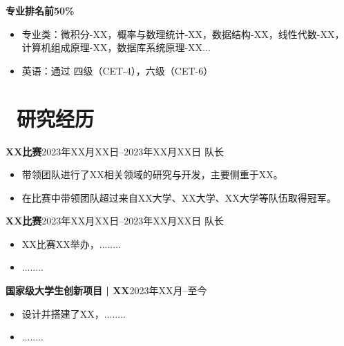 \documentclass[11pt]{article}
\begin{document}
 {\bf 专业排名前50\%}
\begin{itemize}[parsep=0.5ex]
    \item 专业类：微积分-XX，概率与数理统计-XX，数据结构-XX，线性代数-XX，计算机组成原理-XX，数据库系统原理-XX...
    \item 英语：通过 四级（CET-4），六级（CET-6）

\end{itemize}

\section{\texorpdfstring{\makebox[\widthof{\faUniversity}][c]{\color{ZZU_BLUE}\faUniversity}\ 研究经历}{研究经历}}
 {\bf XX比赛}\hfill 2023年XX月XX日\hspace{0.5em}--\hspace{0.5em}2023年XX月XX日
\newline
队长
\begin{itemize}
    \item {带领团队进行了XX相关领域的研究与开发，主要侧重于XX。}
    \item {在比赛中带领团队超过来自XX大学、XX大学、XX大学等队伍取得冠军。}
\end{itemize}

{\bf XX比赛}\hfill 2023年XX月XX日\hspace{0.5em}--\hspace{0.5em}2023年XX月XX日
\newline
队长
\begin{itemize}
    \item {XX比赛XX举办，........}
    \item {........}
\end{itemize}

{\bf 国家级大学生创新项目\hspace{0.2em} | \hspace{0.2em}XX}\hfill 2023年XX月\hspace{0.5em}--\hspace{0.5em}至今
\begin{itemize}
    \item {设计并搭建了XX，........}
    \item {........}
\end{itemize}
\end{document}

